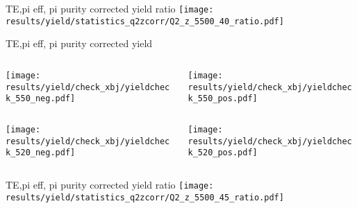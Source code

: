 \begin{frame}{TE,pi eff, pi purity corrected yield ratio}
\texttt{[image: results/yield/statistics\_q2zcorr/Q2\_z\_5500\_40\_ratio.pdf]}
\end{frame}
\begin{frame}{TE,pi eff, pi purity corrected yield}
\begin{columns}
\begin{column}[T]{0.5\textwidth}
\texttt{[image: results/yield/check\_xbj/yieldcheck\_550\_neg.pdf]}
\end{column}
\begin{column}[T]{0.5\textwidth}
\texttt{[image: results/yield/check\_xbj/yieldcheck\_550\_pos.pdf]}
\end{column}
\end{columns}
\begin{columns}
\begin{column}[T]{0.5\textwidth}
\texttt{[image: results/yield/check\_xbj/yieldcheck\_520\_neg.pdf]}
\end{column}
\begin{column}[T]{0.5\textwidth}
\texttt{[image: results/yield/check\_xbj/yieldcheck\_520\_pos.pdf]}
\end{column}
\end{columns}
\end{frame}
\begin{frame}{TE,pi eff, pi purity corrected yield ratio}
\texttt{[image: results/yield/statistics\_q2zcorr/Q2\_z\_5500\_45\_ratio.pdf]}
\end{frame}
